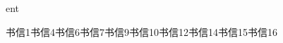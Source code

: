 ent

书信1\newline{}书信4\newline{}书信6\newline{}书信7\newline{}书信9\newline{}书信10\newline{}书信12\newline{}书信14\newline{}书信15\newline{}书信16\ne